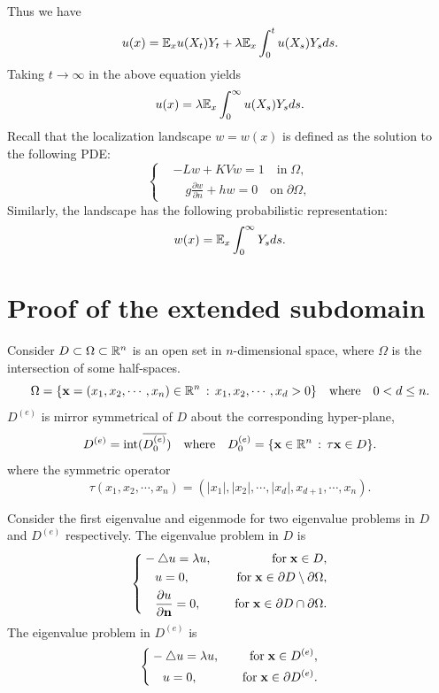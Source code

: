 \documentclass[a4paper,11pt]{article}
\begin{document}
\begin{appendices}
Thus we have
\begin{equation*}
u(x) = \mathbb{E}_xu(X_t)Y_t+\lambda\mathbb{E}_x\int_0^t u(X_s)Y_sds.
\end{equation*}
Taking $t\rightarrow\infty$ in the above equation yields
\begin{equation*}
u(x) = \lambda\mathbb{E}_x\int_0^\infty u(X_s)Y_sds.
\end{equation*}
Recall that the localization landscape $w = w(x)$ is defined as the solution to the following PDE:
\begin{equation*}
\left\{
\begin{split}
& - L w + K V w = 1 \quad \textrm{in} \; \Omega, \\
& \quad g \frac{\partial w}{\partial n} + h w = 0 \quad \textrm{on} \; \partial \Omega,
\end{split}\right.
\end{equation*}
Similarly, the landscape has the following probabilistic representation:
\begin{equation*}
w(x) = \mathbb{E}_x\int_0^\infty Y_sds.
\end{equation*}


\section{Proof of the extended subdomain}\label{appD}

Consider $D \subset \Omega \subset \mathbb{R}^n$ is an open set in $n$-dimensional space, where $\Omega$ is the intersection of some half-spaces.
$$ \Omega = \{\mathbf{x} = (x_1, x_2, \cdots, x_n) \in \mathbb{R}^n \, : \, x_1, x_2, \cdots, x_d > 0\} \quad \text{where} \quad 0 < d \leq n. $$
$D^{(e)}$ is mirror symmetrical of $D$ about the corresponding hyper-plane,
$$ D^{(e)} = \mathrm{int}(\overline{D^{(e)}_0}) \quad \text{where} \quad D^{(e)}_0 = \{\mathbf{x} \in \mathbb{R}^n \, : \, \tau \mathbf{x} \in D \}. $$
where the symmetric operator
$$ \tau (x_1, x_2, \cdots, x_n) = (|x_1|, |x_2|, \cdots, |x_d|, x_{d+1}, \cdots, x_n). $$

Consider the first eigenvalue and eigenmode for two eigenvalue problems in $D$ and $D^{(e)}$ respectively. The eigenvalue problem in $D$ is
\begin{equation}\label{eigenD}
\left\{
\begin{split}
& -\triangle u = \lambda u, & \quad \text{for} \; \mathbf{x} \in D, \\
& \quad u = 0, & \quad \text{for} \; \mathbf{x} \in \partial D \setminus \partial \Omega, \\
& \quad \frac{\partial u}{\partial \mathbf{n}} = 0, & \quad \text{for} \; \mathbf{x} \in \partial D \cap \partial \Omega.
\end{split}
\right.
\end{equation}
The eigenvalue problem in $D^{(e)}$ is
\begin{equation}\label{eigenDe}
\left\{
\begin{split}
& -\triangle u = \lambda u, & \quad \text{for} \; \mathbf{x} \in D^{(e)}, \\
& \quad u = 0, & \quad \text{for} \; \mathbf{x} \in \partial D^{(e)}.
\end{split}
\right.
\end{equation}


\end{appendices}
\end{document}
